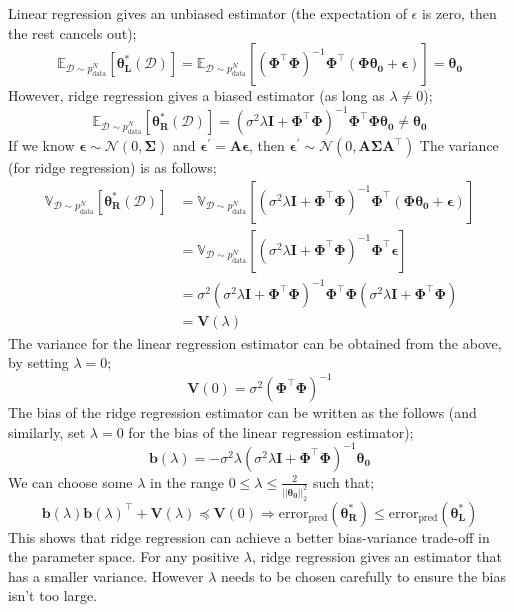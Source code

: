 \documentclass[a4paper, 12pt]{article}
\newcommand{\mat}[1]{\boldsymbol{#1}}
\begin{document}
                Linear regression gives an unbiased estimator (the expectation of $\epsilon$ is zero, then the rest cancels out);
                $$\mathbb{E}_{\mathcal{D} \sim p_\text{data}^N}[\mat{\theta_L^*}(\mathcal{D})] = \mathbb{E}_{\mathcal{D} \sim p_\text{data}^N}[(\mat{\Phi}^\top\mat{\Phi})^{-1}\mat{\Phi}^\top(\mat{\Phi}\mat{\theta_0} + \mat{\epsilon})] = \mat{\theta_0}$$
                However, ridge regression gives a biased estimator (as long as $\lambda \neq 0$);
                $$\mathbb{E}_{\mathcal{D} \sim p_\text{data}^N}[\mat{\theta_R^*}(\mathcal{D})] = (\sigma^2\lambda\mat{I} + \mat{\Phi}^\top\mat{\Phi})^{-1}\mat{\Phi}^\top\mat{\Phi}\mat{\theta_0} \neq \mat{\theta_0}$$
                If we know $\mat{\epsilon} \sim \mathcal{N}(0, \mat{\Sigma})$ and $\mat{\epsilon^\prime} = \mat{A}\mat{\epsilon}$, then $\mat{\epsilon^\prime} \sim \mathcal{N}(0, \mat{A}\mat{\Sigma}\mat{A}^\top)$
                The variance (for ridge regression) is as follows;
                \begin{align*}
                    \mathbb{V}_{\mathcal{D} \sim p_\text{data}^N}[\mat{\theta_R^*}(\mathcal{D})] & = \mathbb{V}_{\mathcal{D} \sim p_\text{data}^N}[(\sigma^2\lambda\mat{I} + \mat{\Phi}^\top\mat{\Phi})^{-1}\mat{\Phi}^\top(\mat{\Phi}\mat{\theta_0} + \mat{\epsilon})] \\
                    & = \mathbb{V}_{\mathcal{D} \sim p_\text{data}^N}[(\sigma^2\lambda\mat{I} + \mat{\Phi}^\top\mat{\Phi})^{-1}\mat{\Phi}^\top\mat{\epsilon}] \\
                    & = \sigma^2(\sigma^2\lambda\mat{I} + \mat{\Phi}^\top\mat{\Phi})^{-1}\mat{\Phi}^\top\mat{\Phi}(\sigma^2\lambda\mat{I} + \mat{\Phi}^\top\mat{\Phi}) \\
                    & = \mat{V}(\lambda)
                \end{align*}
                The variance for the linear regression estimator can be obtained from the above, by setting $\lambda = 0$;
                $$\mat{V}(0) = \sigma^2(\mat{\Phi}^\top\mat{\Phi})^{-1}$$
                The bias of the ridge regression estimator can be written as the follows (and similarly, set $\lambda = 0$ for the bias of the linear regression estimator);
                $$\mat{b}(\lambda) = -\sigma^2\lambda(\sigma^2\lambda\mat{I} + \mat{\Phi}^\top\mat{\Phi})^{-1}\mat{\theta_0}$$
                We can choose some $\lambda$ in the range $0 \leq \lambda \leq \frac{2}{|| \mat{\theta_0} ||_2^2}$ such that;
                $$\mat{b}(\lambda)\mat{b}(\lambda)^\top + \mat{V}(\lambda) \preceq \mat{V}(0) \Rightarrow \mathrm{error}_\text{pred}(\mat{\theta_R^*}) \leq \mathrm{error}_\text{pred}(\mat{\theta_L^*})$$
                This shows that ridge regression can achieve a better bias-variance trade-off in the parameter space.
                For any positive $\lambda$, ridge regression gives an estimator that has a smaller variance.
                However $\lambda$ needs to be chosen carefully to ensure the bias isn't too large.
\end{document}
